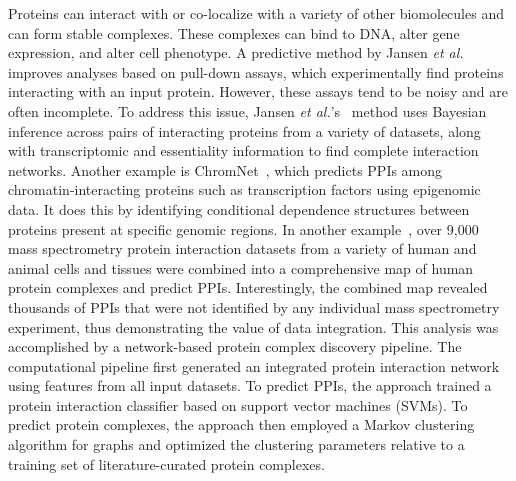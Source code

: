 \documentclass[5p]{elsarticle}
\newcommand{\etal}{\emph{et al.}\xspace}
\begin{document}
Proteins can interact with or co-localize with a variety of other biomolecules and can form stable complexes.
These complexes can bind to DNA, alter gene expression, and alter cell phenotype.
A predictive method by Jansen \etal~\cite{Jansen2003AData} improves analyses based on pull-down assays, which experimentally find proteins interacting with an input protein.
However, these assays tend to be noisy and are often incomplete.
To address this issue, Jansen \etal's~\cite{Jansen2003AData} method uses Bayesian inference across pairs of interacting proteins from a variety of datasets, along with transcriptomic and essentiality information to find complete interaction networks.
Another example is ChromNet~\cite{Lundberg2016ChromNet:Data}, which predicts PPIs among chro\-ma\-tin-inter\-acting proteins such as transcription factors using epigenomic data.
It does this by identifying conditional dependence structures between proteins present at specific genomic regions.
In another example~\cite{Drew2017integration}, over 9,000 mass spectrometry protein interaction datasets from a variety of human and animal cells and tissues were combined into a comprehensive map of human protein complexes and predict PPIs.
Interestingly, the combined map revealed thousands of PPIs that were not identified by any individual mass spectrometry experiment, thus demonstrating the value of data integration.
This analysis was accomplished by a network-based protein complex discovery pipeline.
The computational pipeline first generated an integrated protein interaction network using features from all input datasets.
To predict PPIs, the approach trained a protein interaction classifier based on support vector machines (SVMs). To predict protein complexes, the approach then employed a Markov clustering algorithm for graphs and optimized the clustering parameters relative to a training set of literature-curated protein complexes.
\end{document}
